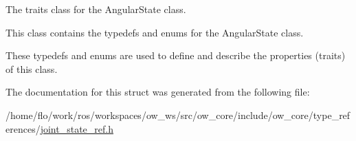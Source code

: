 The traits class for the Angular\+State class. 

This class contains the typedefs and enums for the Angular\+State class.

These typedefs and enums are used to define and describe the properties (traits) of this class. 

The documentation for this struct was generated from the following file\+:\begin{DoxyCompactItemize}
\item 
/home/flo/work/ros/workspaces/ow\+\_\+ws/src/ow\+\_\+core/include/ow\+\_\+core/type\+\_\+references/\hyperlink{joint__state__ref_8h}{joint\+\_\+state\+\_\+ref.\+h}\end{DoxyCompactItemize}
